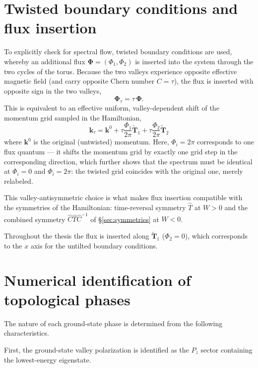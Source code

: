 \section{Twisted boundary conditions and flux insertion}\label{sec:flux_insertion}

To explicitly check for spectral flow, twisted boundary conditions are used, whereby an additional flux $\mathbf{\Phi} = (\Phi_1, \Phi_2)$ is inserted into the system through the two cycles of the torus. Because the two valleys experience opposite effective magnetic field (and carry opposite Chern number $C = \tau$), the flux is inserted with opposite sign in the two valleys,
\begin{equation}
    \mathbf{\Phi}_\tau = \tau\, \mathbf{\Phi}.
\label{eq:flux_valley_sign}
\end{equation}
This is equivalent to an effective uniform, valley-dependent shift of the momentum grid sampled in the Hamiltonian,
\begin{equation}
    \mathbf{k}_\tau = \mathbf{k}^0 + \tau\frac{\Phi_1}{2\pi} \tilde{\mathbf{T}}_1 + \tau\frac{\Phi_2}{2\pi} \tilde{\mathbf{T}}_2
\label{eq:flux_shift}
\end{equation}
where $\mathbf{k}^0$ is the original (untwisted) momentum. Here, $\Phi_i = 2\pi$ corresponds to one flux quantum --- it shifts the momentum grid by exactly one grid step in the corresponding direction, which further shows that the spectrum must be identical at $\Phi_i = 0$ and $\Phi_i = 2\pi$: the twisted grid coincides with the original one, merely relabeled.

This valley-antisymmetric choice is what makes flux insertion compatible with the symmetries of the Hamiltonian: time-reversal symmetry $\hat{T}$ at $W>0$ and the combined symmetry $\hat{C}\hat{T}\hat{C}^{-1}$ of \S\ref{sec:symmetries} at $W<0$.

Throughout the thesis the flux is inserted along $\tilde{\mathbf{T}}_1$ ($\Phi_2 = 0$), which corresponds to the $x$ axis for the untilted boundary conditions.

\section{Numerical identification of topological phases}\label{sec:recognition}

The nature of each ground-state phase is determined from the following characteristics.

First, the ground-state valley polarization is identified as the $P_z$ sector containing the lowest-energy eigenstate.

